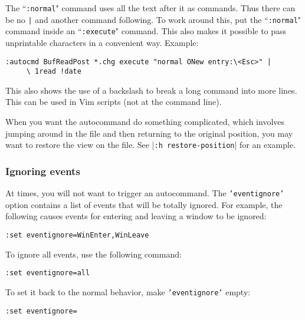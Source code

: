 The ``\texttt{:normal}" command uses all the text after it as commands.
Thus there can be no \texttt{|} and another command following.
To work around this, put the ``\texttt{:normal}" command inside an ``\texttt{:execute}" command.
This also makes it possible to pass unprintable characters in a convenient way.
Example:

\begin{Verbatim}[samepage=true]
 :autocmd BufReadPost *.chg execute "normal ONew entry:\<Esc>" |
     \ 1read !date
\end{Verbatim}

This also shows the use of a backslash to break a long command into more lines.
This can be used in Vim scripts (not at the command line).

When you want the autocommand do something complicated, which involves jumping around in the file and then returning to the original position, you may want to restore the view on the file.
See |\texttt{:h restore-position}| for an example.
\subsubsection{Ignoring events}
At times, you will not want to trigger an autocommand.
The \texttt{'eventignore'} option contains a list of events that will be totally ignored.
For example, the following causes events for entering and leaving a window to be ignored:

\begin{Verbatim}[samepage=true]
 :set eventignore=WinEnter,WinLeave
\end{Verbatim}

To ignore all events, use the following command:

\begin{Verbatim}[samepage=true]
 :set eventignore=all
\end{Verbatim}

To set it back to the normal behavior, make \texttt{'eventignore'} empty:

\begin{Verbatim}[samepage=true]
 :set eventignore=
\end{Verbatim}

\clearpage
